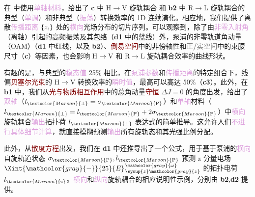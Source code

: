 在  中使用\textcolor{Plum}{单轴材料}，给出了 \textbf{c} 中 H$\to$V \textcolor{NavyBlue}{旋轨耦合} 和 \textbf{b2} 中 R$\to$L \textcolor{NavyBlue}{旋轨耦合}的典型（\textcolor{Plum}{单调}）和非典型（\textcolor{Plum}{振荡}）转换效率的 1D 连续演化。相应地，我们提供了离散\textcolor{Plum}{传播距离} $\{\mathcolor{gray}{z_i}\}$ 处的\textcolor{Plum}{横向}\textcolor{PineGreen}{光场分布}的切片序列。可以观察到，除了由\textcolor{Plum}{非零入射角}（\textcolor{PineGreen}{离轴}）引起的高频振荡及其包络（\textbf{d1} 中的蓝线）外，\textcolor{NavyBlue}{泵浦}的\textcolor{NavyBlue}{非零轨道角动量（OAM）}（\textbf{d1} 中红线，以及 \textbf{b2}）、\textcolor{Maroon}{倒易空间}中的\textcolor{PineGreen}{非傍轴性}和\textcolor{gray}{正}/\textcolor{gray}{实空间}中的束腰尺寸（\textbf{c}）等因素，也会影响 H$\to$V 和 R$\to$L \textcolor{NavyBlue}{旋轨耦合}效率的曲线形状。

有趣的是，与典型的\textcolor{Plum}{稳态值} 25\% 相比，在\textcolor{Plum}{泵浦参数}和\textcolor{Plum}{传播距离}的特定组合下，\textcolor{PineGreen}{线偏}\textcolor{Maroon}{贝塞尔光束}的 H$\to$V 转换效率的\textcolor{Plum}{瞬时值}，最高可以高达 50\%\cite{liSpintoorbitalAngularMomentum2020}（\textbf{c3}）。此外，在 \textbf{b1} 中，我们从\textcolor{Maroon}{光与物质相互作用}中的\textcolor{NavyBlue}{总角动量}\textcolor{Maroon}{守恒} $\Delta J = 0$ 的角度出发，给出了\textcolor{Plum}{双轴}（$l_{\textcolor{Maroon}{\perp}}=\sigma_{\textcolor{Maroon}{\text{P}}}$）和\textcolor{Plum}{单轴}材料（$l_{\textcolor{Maroon}{\perp}}=l_{\textcolor{Maroon}{\text{P}}}+2\sigma_{\textcolor{Maroon}{\text{P}}}$）中\textcolor{Plum}{横向}\textcolor{NavyBlue}{旋轨耦合}\textcolor{Plum}{输出}\textcolor{NavyBlue}{拓扑荷} $l_{\textcolor{Maroon}{\perp}}$ 表达式的简单推导。这允许人们\textcolor{Plum}{不进行具体细节计算}，就直接模糊预测\textcolor{Plum}{输出}所有\textcolor{NavyBlue}{旋轨态}和其\textcolor{NavyBlue}{光强比例分配}。

此外，从\textcolor{Maroon}{散度方程}出发，我们在 \textbf{d1} 中还推导出了一个公式，用于基于\textcolor{NavyBlue}{泵浦}的\textcolor{Plum}{横向}\textcolor{NavyBlue}{自旋轨道状态} $\sigma_{\textcolor{Maroon}{\text{P}}},l_{\textcolor{Maroon}{\text{P}}}$ 预测 z 分量电场 $\Xint{\mathcolor{gray}{-}}{25}{E}^{\;\!\mathcolor{gray}{\omega}}_{\;\! \symup{z} \mathcolor{gray}{z}}$ 的\textcolor{NavyBlue}{拓扑电荷} $l_{\textcolor{Maroon}{\text{z}}}$。\textcolor{Plum}{横向}和\textcolor{Plum}{纵向}\textcolor{NavyBlue}{旋轨耦合}的相应说明性示例，分别由 \textbf{b2},\textbf{d2} 提供。

